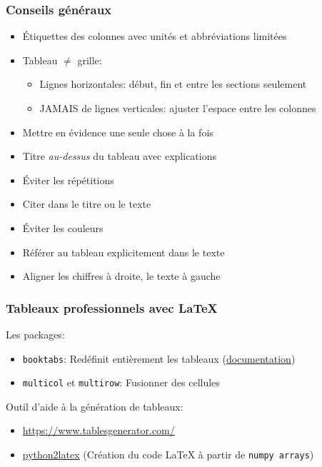 \documentclass[aspectratio=169]{beamer}
\begin{document}
\begin{frame}[c]\frametitle{Conseils généraux}

\vspace{-4mm}

\begin{itemize}
	\item Étiquettes des colonnes avec unités et abbréviations limitées
	\item Tableau $\ne$ grille:
	\begin{itemize}
		\item Lignes horizontales: début, fin et entre les sections seulement
		\item JAMAIS de lignes verticales: ajuster l'espace entre les colonnes
	\end{itemize}
	\vspace{-3mm}
	\item Mettre en évidence une seule chose à la fois
	\item Titre \textit{au-dessus} du tableau avec explications
	\item Éviter les répétitions
	\item Citer dans le titre ou le texte
	\item Éviter les couleurs
	\item Référer au tableau explicitement dans le texte
	\item Aligner les chiffres à droite, le texte à gauche
\end{itemize}

\end{frame}


\begin{frame}[fragile]\frametitle{Tableaux professionnels avec LaTeX}

\vspace{-3mm}

Les packages:
\vspace{-\parskip}
\begin{itemize}
	\item \texttt{booktabs}: Redéfinit entièrement les tableaux (\href{https://ctan.mirror.rafal.ca/info/translations/booktabs/fr/f-booktabs.pdf}{\underline{documentation}})
	\item \texttt{multicol} et \texttt{multirow}: Fusionner des cellules
\end{itemize}


Outil d'aide à la génération de tableaux:
\vspace{-\parskip}
\begin{itemize}
	\item \url{https://www.tablesgenerator.com/}
	\item \href{https://github.com/jsleb333/python2latex}{\underline{python2latex}} (Création du code LaTeX à partir de \texttt{numpy arrays})
\end{itemize}

\end{frame}
\end{document}

